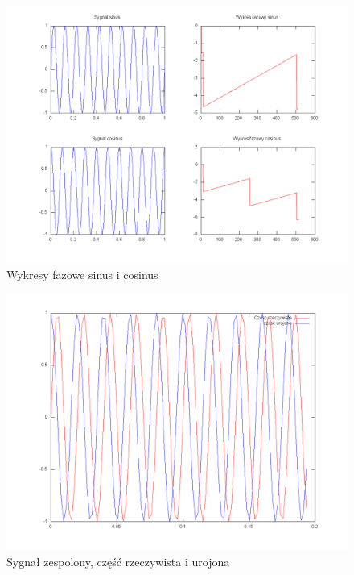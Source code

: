 \documentclass[wide,a4paper,titlepage,12pt]{mwart}
\begin{document}
	\begin{landscape}
	  \begin{figure}[htbp]
	    \begin{center}
	      \includegraphics[scale=.5]{out/fig5.png}
	      \caption{\label{fig5} Wykresy fazowe sinus i cosinus}
	    \end{center}
	  \end{figure}
	\end{landscape}
	
	\begin{landscape}
	  \begin{figure}[htbp]
	    \begin{center}
	      \includegraphics[scale=.5]{out/fig6.png}
	      \caption{\label{fig6} Sygnał zespolony, część rzeczywista i urojona}
	    \end{center}
	  \end{figure}
	\end{landscape}
	
\end{document}
